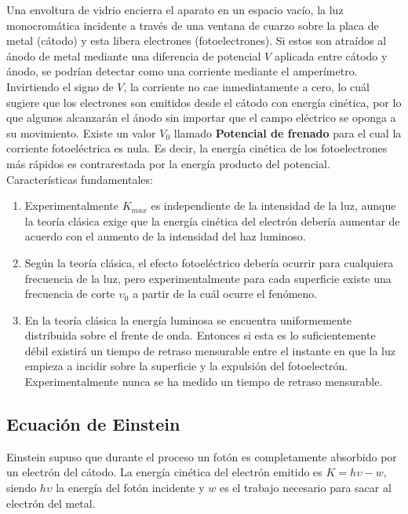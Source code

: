 \documentclass[oneside]{book}
\numberwithin{equation}{section}
\numberwithin{figure}{section}
\numberwithin{table}{section}
\begin{document}
			Una envoltura de vidrio encierra el aparato en un espacio vacío, la luz monocromática incidente a través de una ventana de cuarzo sobre la placa de metal (cátodo)	y esta libera electrones (fotoelectrones). Si estos son atraídos al ánodo de metal mediante una diferencia de potencial $V$ aplicada entre cátodo y ánodo, se podrían detectar como una corriente mediante el amperímetro.\\
			
			Invirtiendo el signo de $V$, la corriente no cae inmediatamente a cero, lo cuál sugiere que los electrones son emitidos desde el cátodo con energía cinética, por lo que algunos alcanzarán el ánodo sin importar que el campo eléctrico se oponga a su movimiento. Existe un valor $V_0$ llamado \textbf{Potencial de frenado} para el cual la corriente fotoeléctrica es nula. Es decir, la energía cinética de los fotoelectrones más rápidos es contrarestada por la energía producto del potencial. \\
			
			Características fundamentales:
			
			\begin{enumerate}					
			\item Experimentalmente $K_{max}$ es independiente de la intensidad de la luz, aunque la teoría clásica exige que la energía cinética del electrón debería aumentar de acuerdo con el aumento de la intensidad del haz luminoso.
			\item Según la teoría clásica, el efecto fotoeléctrico debería ocurrir para cualquiera frecuencia de la luz, pero experimentalmente para cada superficie existe una frecuencia de corte $\upsilon_0$ a partir de la cuál ocurre el fenómeno.
			\item En la teoría clásica la energía luminosa se encuentra uniformemente distribuida sobre el frente de onda. Entonces si esta es lo suficientemente débil existirá un tiempo de retraso mensurable entre el instante en que la luz empieza a incidir sobre la superficie y la expulsión del fotoelectrón. Experimentalmente nunca se ha medido un tiempo de retraso mensurable.
			\end{enumerate}			
					
			\subsection{Ecuación de Einstein}
			
				Einstein supuso que durante el proceso un fotón es completamente absorbido por un electrón del cátodo. La energía cinética del electrón emitido es $K=h\upsilon-w$, siendo $h\upsilon$ la energía del fotón incidente y $w$ es el trabajo necesario para sacar al electrón del metal.\\
				
\end{document}
